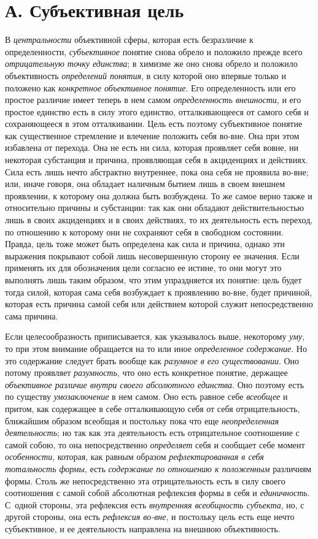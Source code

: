 \section[А. Субъективная цель]{А. Субъективная цель}
В {\em центральности}
объективной сферы, которая есть безразличие к определенности,
{\em субъективное}
понятие снова обрело и положило прежде всего
{\em отрицательную точку единства};
в химизме же оно снова обрело и положило объективность
{\em определений понятия},
в силу которой оно впервые только и положено как
{\em конкретное объективное понятие}.
Его определенность или его простое различие имеет теперь в
нем самом {\em определенность
внешности}, и его простое единство есть в силу этого
единство, отталкивающееся от самого себя и сохраняющееся в этом
отталкивании. Цель есть поэтому субъективное понятие как существенное
стремление и влечение положить себя во-вне. Она при этом избавлена от
перехода. Она не есть ни сила, которая проявляет себя вовне, ни некоторая
субстанция и причина, проявляющая себя в акциденциях и действиях. Сила есть
лишь нечто абстрактно внутреннее, пока она себя не проявила во-вне; или,
иначе говоря, она обладает наличным бытием лишь в своем внешнем проявлении,
к которому она должна быть возбуждена. То же самое верно также и
относительно причины и субстанции: так как они обладают действительностью
лишь в своих акциденциях и в своих действиях, то их деятельность есть
переход, по отношению к которому они не сохраняют себя в свободном
состоянии. Правда, цель тоже может быть определена как сила и причина,
однако эти выражения покрывают собой лишь несовершенную сторону ее
значения. Если применять их для обозначения цели согласно ее истине, то они
могут это выполнять лишь таким образом, что этим упраздняется их понятие:
цель будет тогда силой, которая сама себя возбуждает к проявлению во-вне,
будет причиной, которая есть причина самой себя или действием которой
служит непосредственно сама причина.

Если целесообразность приписывается, как указывалось выше,
некоторому {\em уму}, то
при этом внимание обращается на то или иное
{\em определенное содержание}.
Но это содержание следует брать вообще как
{\em разумное в его существовании}.
Оно потому проявляет
{\em разумность}, что оно
есть конкретное понятие, держащее
{\em объективное различие внутри своего
абсолютного единства}. Оно поэтому есть по существу
{\em умозаключение} в нем
самом. Оно есть равное себе
{\em всеобщее} и притом,
как содержащее в себе отталкивающую себя от себя
отрицательность, ближайшим образом всеобщая и постольку пока
что еще {\em неопределенная
деятельность}; но так как эта деятельность есть
отрицательное соотношение с самой собою, то она непосредственно
{\em определяет} себя и сообщает себе момент {\em особенности},
которая, как равным образом {\em рефлектированная в себя тотальность
формы}, есть {\em содержание по отношению к
положенным} различиям формы. Столь же непосредственно эта
отрицательность есть в силу своего соотношения с самой собой абсолютная
рефлексия формы в себя и {\em единичность}.
С~одной стороны, эта рефлексия есть {\em внутренняя всеобщность субъекта},
но, с другой стороны, она есть {\em рефлексия во-вне}, и
постольку цель есть еще нечто субъективное, и ее деятельность направлена на
внешнюю объективность.

